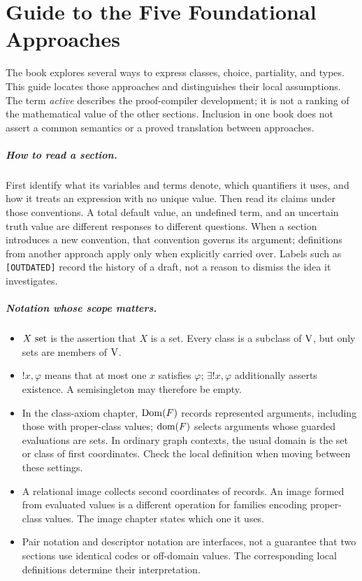 \def\topic{Summary of Approaches}

\chapter*{Guide to the Five Foundational Approaches}

The book explores several ways to express classes, choice, partiality, and
types. This guide locates those approaches and distinguishes their local
assumptions. The term \emph{active} describes the proof-compiler development;
it is not a ranking of the mathematical value of the other sections.
Inclusion in one book does not assert a common semantics or a proved
translation between approaches.

\paragraph{How to read a section.}
First identify what its variables and terms denote, which quantifiers it
uses, and how it treats an expression with no unique value. Then read its
claims under those conventions. A total default value, an undefined term,
and an uncertain truth value are different responses to different questions.
When a section introduces a new convention, that convention governs its
argument; definitions from another approach apply only when explicitly
carried over. Labels such as \texttt{[OUTDATED]} record the history of a draft,
not a reason to dismiss the idea it investigates.

\paragraph{Notation whose scope matters.}
\begin{itemize}
\item $X\mathrm{\ set}$ is the assertion that $X$ is a set. Every class is a
subclass of $\mathrm{V}$, but only sets are members of $\mathrm{V}$.
\item $!x,\varphi$ means that at most one $x$ satisfies $\varphi$;
$\exists!x,\varphi$ additionally asserts existence. A semisingleton
may therefore be empty.
\item In the class-axiom chapter, $\mathrm{Dom}(F)$ records represented
arguments, including those with proper-class values; $\mathrm{dom}(F)$ selects
arguments whose guarded evaluations are sets. In ordinary graph
contexts, the usual domain is the set or class of first coordinates.
Check the local definition when moving between these settings.
\item A relational image collects second coordinates of records.
An image formed from evaluated values is a different operation for
families encoding proper-class values. The image chapter states which
one it uses.
\item Pair notation and descriptor notation are interfaces, not a
guarantee that two sections use identical codes or off-domain values.
The corresponding local definitions determine their interpretation.
\end{itemize}

